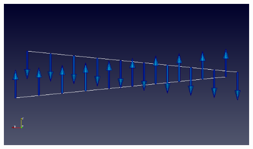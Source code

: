 \documentclass[aspectratio=1610,t,10pt]{beamer}
\begin{document}
\begin{frame}
\begin{columns}[t]
\begin{column}{.48\textwidth}
\begin{minipage}{0.30\linewidth}
		\end{minipage}~~~~%
		\begin{minipage}{0.49\linewidth}
			\includegraphics[width=\linewidth]{img/Initial}
			

\end{minipage}
\end{column}
\end{columns}
\end{frame}
\end{document}
